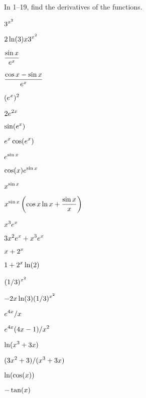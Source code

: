 \begin{exercises}
In 1--19, find the derivatives of the functions.

\twocol

\exercise $\displaystyle 3^{x^2}$
\begin{answer} $\displaystyle 2\ln(3)x3^{x^2}$
\end{answer}

\exercise $\displaystyle {\sin x \over e^x}$
\begin{answer} $\displaystyle {\cos x-\sin x \over e^x}$
\end{answer}

\exercise $\displaystyle (e^x)^2$
\begin{answer} $\displaystyle 2e^{2x}$
\end{answer}

\exercise $\displaystyle \sin(e^x)$
\begin{answer} $\displaystyle e^x\cos(e^x)$
\end{answer}

\exercise $\displaystyle e^{\sin x}$
\begin{answer} $\displaystyle  \cos (x) e^{\sin x}$
\end{answer}

\exercise $\displaystyle x^{\sin x}$
\begin{answer} $\displaystyle x^{\sin x}\left(\cos x\ln x+{\sin x\over x}\right)$
\end{answer}

\exercise  $\displaystyle x^3e^x$
\begin{answer} $\displaystyle 3x^2e^x+x^3e^x$
\end{answer}

\exercise  $\displaystyle x+2^x$
\begin{answer} $\displaystyle 1+2^x\ln(2)$
\end{answer}

\exercise  $\displaystyle (1/3)^{x^2}$
\begin{answer} $\displaystyle -2x\ln(3)(1/3)^{x^2}$
\end{answer}

\exercise  $\displaystyle e^{4x}/x$
\begin{answer} $\displaystyle e^{4x}(4x-1)/x^2$
\end{answer}

\exercise  $\displaystyle \ln(x^3+3x)$
\begin{answer} $\displaystyle (3x^2+3)/(x^3+3x)$
\end{answer}

\exercise  $\displaystyle \ln(\cos(x))$
\begin{answer} $\displaystyle -\tan(x)$
\end{answer}


\end{exercises}
